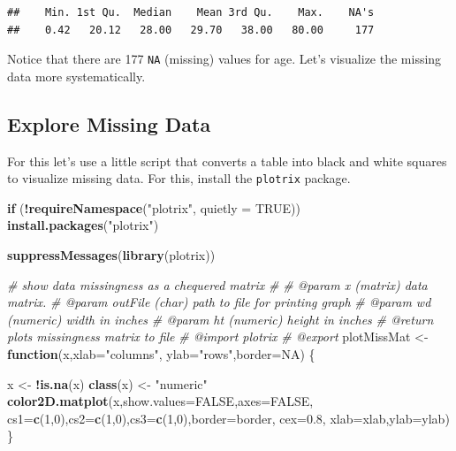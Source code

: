 \documentclass[
]{book}
\newenvironment{Shaded}{\begin{snugshade}}{\end{snugshade}}
\newcommand{\AttributeTok}[1]{\textcolor[rgb]{0.13,0.29,0.53}{#1}}
\newcommand{\CommentTok}[1]{\textcolor[rgb]{0.56,0.35,0.01}{\textit{#1}}}
\newcommand{\ConstantTok}[1]{\textcolor[rgb]{0.56,0.35,0.01}{#1}}
\newcommand{\ControlFlowTok}[1]{\textcolor[rgb]{0.13,0.29,0.53}{\textbf{#1}}}
\newcommand{\DecValTok}[1]{\textcolor[rgb]{0.00,0.00,0.81}{#1}}
\newcommand{\FloatTok}[1]{\textcolor[rgb]{0.00,0.00,0.81}{#1}}
\newcommand{\FunctionTok}[1]{\textcolor[rgb]{0.13,0.29,0.53}{\textbf{#1}}}
\newcommand{\NormalTok}[1]{#1}
\newcommand{\OtherTok}[1]{\textcolor[rgb]{0.56,0.35,0.01}{#1}}
\newcommand{\SpecialCharTok}[1]{\textcolor[rgb]{0.81,0.36,0.00}{\textbf{#1}}}
\newcommand{\StringTok}[1]{\textcolor[rgb]{0.31,0.60,0.02}{#1}}
\begin{document}
\begin{verbatim}
##    Min. 1st Qu.  Median    Mean 3rd Qu.    Max.    NA's 
##    0.42   20.12   28.00   29.70   38.00   80.00     177
\end{verbatim}

Notice that there are 177 \texttt{NA} (missing) values for age. Let's visualize the missing data more systematically.

\subsection{Explore Missing Data}\label{explore-missing-data}

For this let's use a little script that converts a table into black and white squares to visualize missing data. For this, install the \texttt{plotrix} package.

\begin{Shaded}
\begin{Highlighting}[]
\ControlFlowTok{if}\NormalTok{ (}\SpecialCharTok{!}\FunctionTok{requireNamespace}\NormalTok{(}\StringTok{"plotrix"}\NormalTok{, }\AttributeTok{quietly =} \ConstantTok{TRUE}\NormalTok{)) }\FunctionTok{install.packages}\NormalTok{(}\StringTok{"plotrix"}\NormalTok{)}

\FunctionTok{suppressMessages}\NormalTok{(}\FunctionTok{library}\NormalTok{(plotrix))}

\CommentTok{\#\textquotesingle{} show data missingness as a chequered matrix}
\CommentTok{\#\textquotesingle{} }
\CommentTok{\#\textquotesingle{} @param x (matrix) data matrix.}
\CommentTok{\#\textquotesingle{} @param outFile (char) path to file for printing graph}
\CommentTok{\#\textquotesingle{} @param wd (numeric) width in inches}
\CommentTok{\#\textquotesingle{} @param ht (numeric) height in inches}
\CommentTok{\#\textquotesingle{} @return plots missingness matrix to file}
\CommentTok{\#\textquotesingle{} @import plotrix}
\CommentTok{\#\textquotesingle{} @export}
\NormalTok{plotMissMat }\OtherTok{\textless{}{-}} \ControlFlowTok{function}\NormalTok{(x,}\AttributeTok{xlab=}\StringTok{"columns"}\NormalTok{,}
        \AttributeTok{ylab=}\StringTok{"rows"}\NormalTok{,}\AttributeTok{border=}\ConstantTok{NA}\NormalTok{) \{}
    
\NormalTok{    x }\OtherTok{\textless{}{-}} \SpecialCharTok{!}\FunctionTok{is.na}\NormalTok{(x)}
    \FunctionTok{class}\NormalTok{(x) }\OtherTok{\textless{}{-}} \StringTok{"numeric"}
    \FunctionTok{color2D.matplot}\NormalTok{(x,}\AttributeTok{show.values=}\ConstantTok{FALSE}\NormalTok{,}\AttributeTok{axes=}\ConstantTok{FALSE}\NormalTok{,}
        \AttributeTok{cs1=}\FunctionTok{c}\NormalTok{(}\DecValTok{1}\NormalTok{,}\DecValTok{0}\NormalTok{),}\AttributeTok{cs2=}\FunctionTok{c}\NormalTok{(}\DecValTok{1}\NormalTok{,}\DecValTok{0}\NormalTok{),}\AttributeTok{cs3=}\FunctionTok{c}\NormalTok{(}\DecValTok{1}\NormalTok{,}\DecValTok{0}\NormalTok{),}\AttributeTok{border=}\NormalTok{border,}
        \AttributeTok{cex=}\FloatTok{0.8}\NormalTok{,}
        \AttributeTok{xlab=}\NormalTok{xlab,}\AttributeTok{ylab=}\NormalTok{ylab)}
\NormalTok{\}}
\end{Highlighting}
\end{Shaded}
\end{document}
